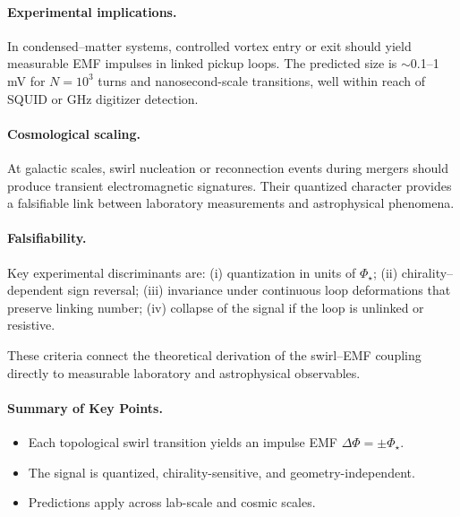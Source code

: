 \documentclass[11pt]{article}
\begin{document}
        \paragraph*{Experimental implications.}
        In condensed–matter systems, controlled vortex entry or exit should yield measurable EMF impulses in
        linked pickup loops. The predicted size is $\sim$0.1–1 mV for $N=10^3$ turns and nanosecond-scale transitions,
        well within reach of SQUID or GHz digitizer detection.

        \paragraph*{Cosmological scaling.}
        At galactic scales, swirl nucleation or reconnection events during mergers should produce transient
        electromagnetic signatures. Their quantized character provides a falsifiable link between laboratory
        measurements and astrophysical phenomena.

        \paragraph*{Falsifiability.}
        Key experimental discriminants are: (i) quantization in units of $\Phi_\star$; (ii) chirality–dependent
        sign reversal; (iii) invariance under continuous loop deformations that preserve linking number; (iv)
        collapse of the signal if the loop is unlinked or resistive.

        These criteria connect the theoretical derivation of the swirl–EMF coupling directly to measurable
        laboratory and astrophysical observables.

        \paragraph*{Summary of Key Points.}
        \begin{itemize}
          \item Each topological swirl transition yields an impulse EMF \( \Delta \Phi = \pm \Phi_\star \).
          \item The signal is quantized, chirality-sensitive, and geometry-independent.
          \item Predictions apply across lab-scale and cosmic scales.
        \end{itemize}




\end{document}
